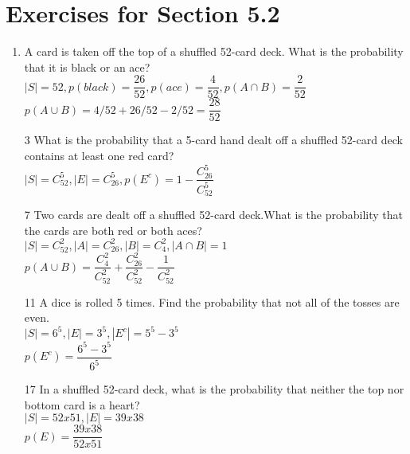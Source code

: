\documentclass[12pt]{article}
\begin{document}
\section*{Exercises for Section 5.2}
\begin{enumerate}
    \item A card is taken off the top of a shuffled 52-card deck. What is the probability that it is black or an ace?\\
	$|S| = 52, p(black) = \dfrac{26}{52}, p(ace)=\dfrac{4}{52}, p(A\cap B) = \dfrac{2}{52}$\\
	$p(A\cup B) =  4/52 + 26/52 - 2/52 = \dfrac{28}{52}$
    \item [3] What is the probability that a 5-card hand dealt off a shuffled 52-card deck contains at least one red card?\\
	$|S| = C_{52}^5, |E| = C_{26}^{5}, p(E^c) = 1 - \dfrac{C_{26}^5}{C_{52}^5}$
    \item [7] Two cards are dealt off a shuffled 52-card deck.What is the probability that the cards are both red or both aces?\\
	$|S| = C_{52}^2, |A|=C_{26}^2, |B|=C_{4}^2, |A\cap B| = 1$\\
	$p(A\cup B) = \dfrac{C_4^2}{C_{52}^2} + \dfrac{C_{26}^2}{C_{52}^2} - \dfrac{1}{C_{52}^2}$
    \item [11] A dice is rolled 5 times. Find the probability that not all of the tosses are even.\\
	$|S| = 6^5, |E| = 3^5, |E^c| = 5^5 - 3^5$\\
	$p(E^c) = \dfrac{6^5-3^5}{6^5}$
    \item [17] In a shuffled 52-card deck, what is the probability that neither the top nor bottom card is a heart?\\
	$|S| = 52x51, |E| = 39x38$\\
	$p(E)= \dfrac{39x38}{52x51}$
\end{enumerate}
\end{document}
